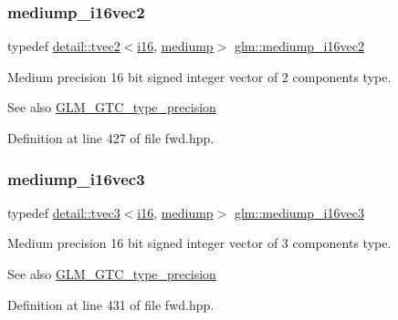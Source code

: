 \subsubsection{\texorpdfstring{mediump\+\_\+i16vec2}{mediump\_i16vec2}}
{\footnotesize\ttfamily typedef \hyperlink{structglm_1_1detail_1_1tvec2}{detail\+::tvec2}$<$\hyperlink{group__gtc__type__precision_ga35e5542ca05b29cc256fdafb8503d1fd}{i16}, \hyperlink{namespaceglm_a0f04f086094c747d227af4425893f545a6416f3ea0c9025fb21ed50c4d6620482}{mediump}$>$ \hyperlink{group__gtc__type__precision_ga664a0266910df3c2d6559651f94d32e6}{glm\+::mediump\+\_\+i16vec2}}

Medium precision 16 bit signed integer vector of 2 components type. \begin{DoxySeeAlso}{See also}
\hyperlink{group__gtc__type__precision}{G\+L\+M\+\_\+\+G\+T\+C\+\_\+type\+\_\+precision} 
\end{DoxySeeAlso}


Definition at line 427 of file fwd.\+hpp.

\mbox{\label{group__gtc__type__precision_gad9e470f707da812fe454505c99035471}} 
\subsubsection{\texorpdfstring{mediump\+\_\+i16vec3}{mediump\_i16vec3}}
{\footnotesize\ttfamily typedef \hyperlink{structglm_1_1detail_1_1tvec3}{detail\+::tvec3}$<$\hyperlink{group__gtc__type__precision_ga35e5542ca05b29cc256fdafb8503d1fd}{i16}, \hyperlink{namespaceglm_a0f04f086094c747d227af4425893f545a6416f3ea0c9025fb21ed50c4d6620482}{mediump}$>$ \hyperlink{group__gtc__type__precision_gad9e470f707da812fe454505c99035471}{glm\+::mediump\+\_\+i16vec3}}

Medium precision 16 bit signed integer vector of 3 components type. \begin{DoxySeeAlso}{See also}
\hyperlink{group__gtc__type__precision}{G\+L\+M\+\_\+\+G\+T\+C\+\_\+type\+\_\+precision} 
\end{DoxySeeAlso}


Definition at line 431 of file fwd.\+hpp.

\mbox{\label{group__gtc__type__precision_gad9aca299fc3e96c84be6b063381c9f3e}} 
